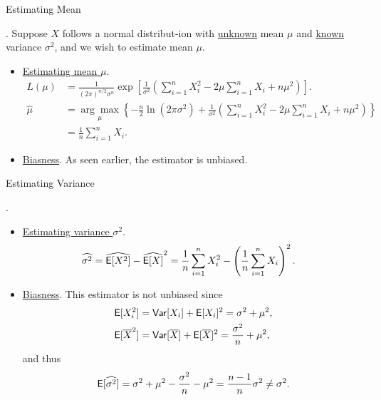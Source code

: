 \begin{frame}{Estimating Mean}

\justifying
{}. Suppose $X$ follows a normal distribut-ion with \underline{unknown} mean $\mu$ and \underline{known} variance $\sigma^2$, and we wish to estimate mean $\mu$.
\begin{itemize}
	\item \underline{Estimating mean $\mu$}. 
	\footnotesize
	\begin{align*}
	L(\mu) & =  \frac{1}{(2\pi)^{n/2}\sigma^n}\exp\left[\frac{1}{\sigma^2}\left(\sum_{i=1}^n X_i^2 - 2\mu\sum_{i=1}^n X_i + n\mu^2 \right) \right]. \\
	\widehat{\mu} & = \underset{\mu}{\arg\max}\left\{-\frac{n}{2}\ln(2\pi\sigma^2) + \frac{1}{\sigma^2}\left(\sum_{i=1}^n X_i^2 - 2\mu\sum_{i=1}^n X_i + n\mu^2 \right) \right\} \\
	& = \frac{1}{n}\sum_{i=1}^n X_i.
	\end{align*}
	\normalsize
	\item \underline{Biasness}. As seen earlier, the estimator is unbiased.
\end{itemize}

\end{frame}


\begin{frame}{Estimating Variance}

.
\begin{itemize}
	\item \underline{Estimating variance $\sigma^2$}.
	\begin{align*}
	\widehat{\sigma^2} & = \widehat{\mathsf{E}[X^2]} - \widehat{\mathsf{E}[X]}^2 = \frac{1}{n}\sum_{i=1}^n X_i^2 - \left(\frac{1}{n} \sum_{i=1}^n X_i \right)^2.
	\end{align*}
	\item \underline{Biasness}. This estimator is not unbiased since
	\begin{align*}
	\mathsf{E}[X_i^2] & = \mathsf{Var}[X_i] + \mathsf{E}[X_i]^2 = \sigma^2 + \mu^2, \\
	\mathsf{E}[\overline{X}^2] & = \mathsf{Var}[\overline{X}] + \mathsf{E}[\overline{X}]^2 = \frac{\sigma^2}{n} + \mu^2,
	\end{align*}
	and thus
	\begin{align*}
	\mathsf{E}[\widehat{\sigma^2}] = \sigma^2 + \mu^2 - \frac{\sigma^2}{n} - \mu^2 = \frac{n-1}{n}\sigma^2 \neq \sigma^2.
	\end{align*}
\end{itemize}

\end{frame}

